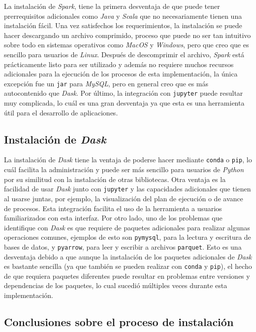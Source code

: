 La instalación de \textit{Spark}, tiene la primera desventaja de que puede tener prerrequisitos adicionales como \textit{Java} y \textit{Scala} que no necesariamente tienen una instalación fácil. Una vez satisfechos los requerimientos, la instalación se puede hacer descargando un archivo comprimido, proceso que puede no ser tan intuitivo sobre todo en sistemas operativos como \textit{MacOS} y \textit{Windows}, pero que creo que es sencillo para usuarios de \textit{Linux}. Después de descomprimir el archivo, \textit{Spark} está prácticamente listo para ser utilizado y además no requiere muchos recursos adicionales para la ejecución de los procesos de esta implementación, la única excepción fue un \texttt{jar} para \textit{MySQL}, pero en general creo que es más autocontenido que \textit{Dask}. Por último, la integración con \texttt{jupyter} puede resultar muy complicada, lo cuál es una gran desventaja ya que esta es una herramienta útil para el desarrollo de aplicaciones.


\subsection{Instalación de \textit{Dask}}

La instalación de \textit{Dask} tiene la ventaja de poderse hacer mediante \texttt{conda} o \texttt{pip}, lo cuál facilita la administración y puede ser más sencillo para usuarios de \textit{Python} por su similitud con la instalación de otras bibliotecas. Otra ventaja es la facilidad de usar \textit{Dask} junto con \texttt{jupyter} y las capacidades adicionales que tienen al usarse juntas, por ejemplo, la visualización del plan de ejecución o de avance de procesos. Esta integración facilita el uso de la herramienta a usuarios familiarizados con esta interfaz. Por otro lado, uno de los problemas que identifique con \textit{Dask} es que requiere de paquetes adicionales para realizar algunas operaciones comunes, ejemplos de esto son \texttt{pymysql}, para la lectura y escritura de bases de datos, y \texttt{pyarrow}, para leer y escribir a archivos \texttt{parquet}. Esto es una desventaja debido a que aunque la instalación de los paquetes adicionales de \textit{Dask} es bastante sencilla (ya que también se pueden realizar con \texttt{conda} y \texttt{pip}), el hecho de que requiera paquetes diferentes puede resultar en problemas entre versiones y dependencias de los paquetes, lo cual sucedió múltiples veces durante esta implementación.

\subsection{Conclusiones sobre el proceso de instalación}

